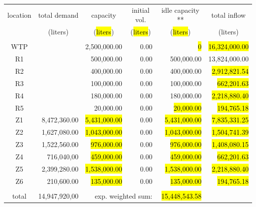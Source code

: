 \documentclass{singlecol}
\theoremstyle{TH}{
\newtheorem{lemma}{Lemma}
\newtheorem{theorem}[lemma]{Theorem}
\newtheorem{corrolary}[lemma]{Corrolary}
\newtheorem{conjecture}[lemma]{Conjecture}
\newtheorem{proposition}[lemma]{Proposition}
\newtheorem{claim}[lemma]{Claim}
\newtheorem{stheorem}[lemma]{Wrong Theorem}
\newtheorem{algorithm}{Algorithm}
}
\theoremstyle{THrm}{
\newtheorem{definition}{Definition}[section]
\newtheorem{question}{Question}[section]
\newtheorem{remark}{Remark}
\newtheorem{scheme}{Scheme}
}
\theoremstyle{THhit}{
\newtheorem{case}{Case}[section]
}
\begin{document}
\begin{table}[t]
\begin{center}
\begin{small}
	\begin{tabular}{ c r r r r r } 
		location & \multicolumn{1}{c}{total demand}      & \multicolumn{1}{c}{capacity} & \multicolumn{1}{c}{initial vol.} & \multicolumn{1}{c}{idle capacity **} & \multicolumn{1}{c}{total inflow}  \\
		      & \multicolumn{1}{c}{(liters)} & \multicolumn{1}{c}{(\hl{liters})}   & \multicolumn{1}{c}{(\hl{liters})}     &  \multicolumn{1}{c}{(\hl{liters})}   &  \multicolumn{1}{c}{(liters)}               \\
		\\
		WTP   &               & 2,500,000.00        & 0.00 &  \hl{0} & \hl{16,324,000.00} \\
		R1    &                 &   500,000.00         & 0.00 &    500,000.00 & 13,824,000.00 \\
		R2    &                 &   400,000.00         & 0.00 &    400,000.00 &  \hl{2,912,821.54} \\
		R3    &                 &   100,000.00         & 0.00 &    100,000.00 &    \hl{662,201.63} \\
	    R4    &                     &   180,000.00         & 0.00 &    180,000.00 &  \hl{2,218,880.40} \\
	    R5    &                     &    20,000.00          & 0.00 &     \hl{20,000.00} &    \hl{194,765.18} \\
	    Z1    &  8,472,360.00 & \hl{5,431,000.00} & 0.00 &      \hl{5,431,000.00} &  \hl{7,835,331.25} \\
	    Z2    &  1,627,080.00 & \hl{1,043,000.00} & 0.00 &     \hl{1,043,000.00} &  \hl{1,504,741.39} \\
	    Z3    &  1,522,560.00 &    \hl{976,000.00} & 0.00 &     \hl{976,000.00} &  \hl{1,408,080.15} \\
	    Z4    &    716,040,00 &     \hl{459,000.00} & 0.00 &     \hl{459,000.00} &    \hl{662,201.63} \\
	    Z5    &  2,399,280.00 &  \hl{1,538,000.00} & 0.00 &    \hl{1,538,000.00} &   \hl{2,218,880.40} \\
	    Z6    &    210,600.00 &     \hl{135,000.00} & 0.00 &     \hl{135,000.00} &    \hl{194,765.18} \\
	    \\
	    total & 14,947,920,00 & \multicolumn{2}{r}{exp. weighted sum:} & \hl{15,448,543.58}   & \\

\end{tabular}
\end{small}
\end{center}
\end{table}
\end{document}
